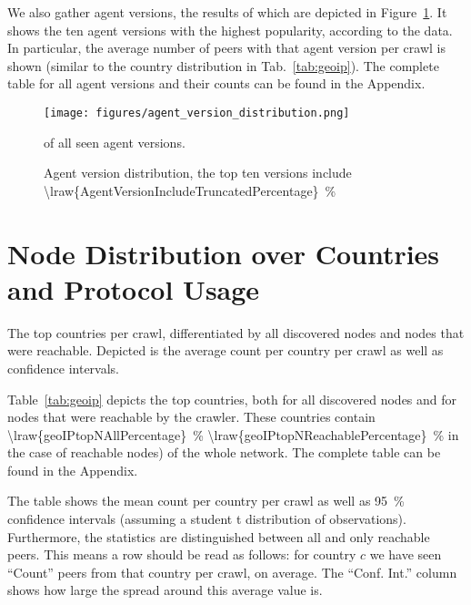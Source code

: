 \documentclass[10pt]{article}
\begin{document}
We also gather agent versions, the results of which are depicted in Figure~\ref{figs:agent_version_distribution}.
It shows the ten agent versions with the highest popularity, according to the data.
In particular, the average number of peers with that agent version per crawl is shown (similar to the country distribution in Tab.~\ref{tab:geoip}).
The complete table for all agent versions and their counts can be found in the Appendix.
%
\begin{figure}[ht]
  \centering
  \texttt{[image: figures/agent\_version\_distribution.png]}
  \caption{Agent version distribution, the top ten versions include \SI{\lraw{AgentVersionIncludeTruncatedPercentage}}{\percent}} of all seen agent versions.
  \label{figs:agent_version_distribution}
\end{figure}

\section{Node Distribution over Countries and Protocol Usage}
\label{sec:eval_country_distribution}
%
\begin{table}[htb]

\caption{The top  countries per crawl, differentiated by all discovered nodes and nodes that were reachable. Depicted is the average count per country per crawl as well as confidence intervals.}
\label{tab:geoip}
\end{table}
%

Table~\ref{tab:geoip} depicts the top  countries, both for all discovered nodes and for nodes that were reachable by the crawler.
These  countries contain \SI{\lraw{geoIPtopNAllPercentage}}{\percent} \SI{\lraw{geoIPtopNReachablePercentage}}{\percent} in the case of reachable nodes) of the whole network.
The complete table can be found in the Appendix.

The table shows the mean count per country per crawl as well as \SI{95}{\percent} confidence intervals (assuming a student t distribution of observations).
Furthermore, the statistics are distinguished between all and only reachable peers.
This means a row should be read as follows: for country $c$ we have seen ``Count'' peers from that country per crawl, on average.
The ``Conf. Int.'' column shows how large the spread around this average value is.
\end{document}
